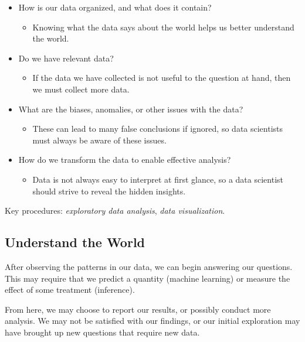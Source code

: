 \documentclass[
  letterpaper,
  DIV=11,
  numbers=noendperiod]{scrreprt}
\providecommand{\tightlist}{%
  \setlength{\itemsep}{0pt}\setlength{\parskip}{0pt}}\usepackage{longtable,booktabs,array}
\begin{document}
\begin{itemize}
\tightlist
\item
  How is our data organized, and what does it contain?

  \begin{itemize}
  \tightlist
  \item
    Knowing what the data says about the world helps us better
    understand the world.
  \end{itemize}
\item
  Do we have relevant data?

  \begin{itemize}
  \tightlist
  \item
    If the data we have collected is not useful to the question at hand,
    then we must collect more data.
  \end{itemize}
\item
  What are the biases, anomalies, or other issues with the data?

  \begin{itemize}
  \tightlist
  \item
    These can lead to many false conclusions if ignored, so data
    scientists must always be aware of these issues.
  \end{itemize}
\item
  How do we transform the data to enable effective analysis?

  \begin{itemize}
  \tightlist
  \item
    Data is not always easy to interpret at first glance, so a data
    scientist should strive to reveal the hidden insights.
  \end{itemize}
\end{itemize}

Key procedures: \emph{exploratory data analysis}, \emph{data
visualization}.

\subsection{Understand the World}\label{understand-the-world}

After observing the patterns in our data, we can begin answering our
questions. This may require that we predict a quantity (machine
learning) or measure the effect of some treatment (inference).

From here, we may choose to report our results, or possibly conduct more
analysis. We may not be satisfied with our findings, or our initial
exploration may have brought up new questions that require new data.
\end{document}
